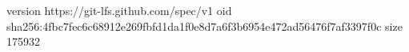version https://git-lfs.github.com/spec/v1
oid sha256:4fbc7fec6c68912e269fbfd1da1f0e8d7a6f3b6954e472ad56476f7af3397f0c
size 175932
